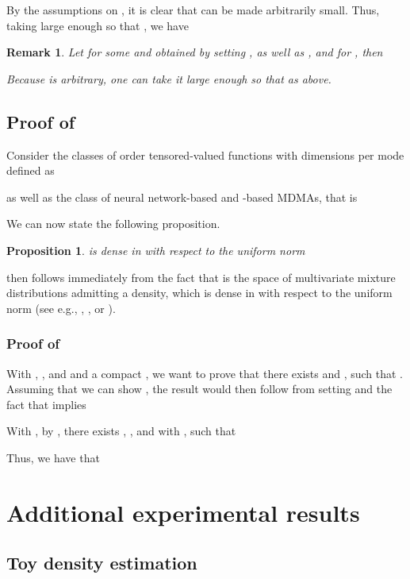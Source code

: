\documentclass{article}
\newtheorem{proposition}{Proposition}
\newtheorem{remark}{Remark}\clearpage{}
\begin{document}
By the assumptions on , it is clear that  can be made arbitrarily small.
Thus, taking  large enough so that , we have


\begin{remark}\label{rmk:activation_cdf}
   Let  for some  and  obtained by setting , as well as ,  and  for , then

Because  is arbitrary, one can take it large enough so that   as above.
\end{remark}



\subsection{Proof of }

Consider the classes of order  tensored-valued functions with  dimensions per mode defined as

as well as the class of neural network-based and -based MDMAs, that is

We can now state the following proposition.
\begin{proposition}\label{prop:universal_da}
 is dense in  with respect to the uniform norm
\end{proposition}
 then follows immediately from the fact that  is the space of multivariate mixture distributions admitting a density, which is dense in  with respect to the uniform norm (see e.g.,  \cite[][Theorem 33.2]{DasGupta2008}, \cite[][Theorem 5]{Cheney2009}, or \cite[][Corollary
11]{Nguyen2019}).

\subsubsection{Proof of }

With , ,  and  and a compact , we want to prove that there exists
 and , such that .
Assuming that we can show , the result would then follow from setting  and the fact that  implies



With , by , there exists , , and  with , such that

Thus, we have that

 \section{Additional experimental results} \label{app:additional_exps}
\subsection{Toy density estimation}
\end{document}
